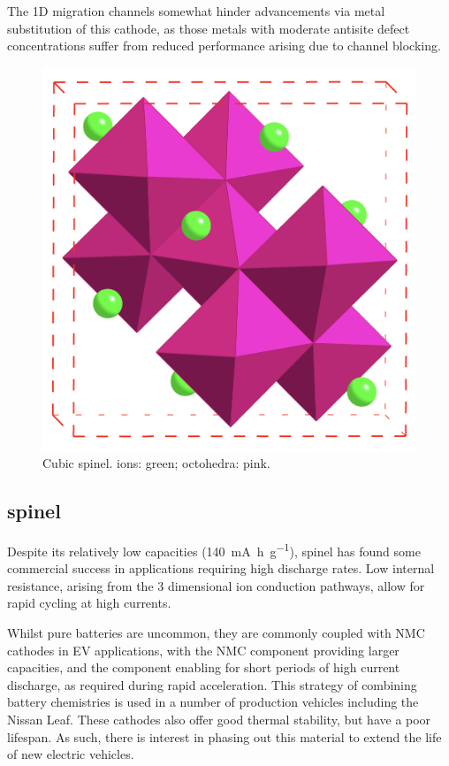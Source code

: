 The 1D migration channels\cite{Islam2014} somewhat hinder advancements via metal substitution of this cathode, as those metals with moderate  antisite defect concentrations suffer from reduced performance arising due to channel blocking.\cite{Fisher2008b}

\newpage
\begin{figure}
\centering
\includegraphics[width=0.7\linewidth]{figures/structures/LiMn2O4}
\caption[Cubic  spinel]{Cubic  spinel.  ions: green;  octohedra: pink.} 
\label{fig:spinel}
\end{figure}

\subsection{ spinel}
Despite its relatively low capacities (\SI{140}{\milli\ampere\hour\per\gram}),  spinel has found some commercial success in applications requiring high discharge rates.
Low internal resistance, arising from the 3 dimensional ion conduction pathways, allow for rapid cycling at high currents.

Whilst pure  batteries are uncommon, they are commonly coupled with NMC cathodes in EV applications, with the NMC component providing larger capacities, and the  component enabling for short periods of high current discharge, as required during rapid acceleration.
This strategy of combining battery chemistries is used in a number of production vehicles including the Nissan Leaf.\cite{Schmuch2018, Blomgren2017}
These cathodes also offer good thermal stability, but have a poor lifespan.
As such, there is interest in phasing out this material to extend the life of new electric vehicles.
\newpage
